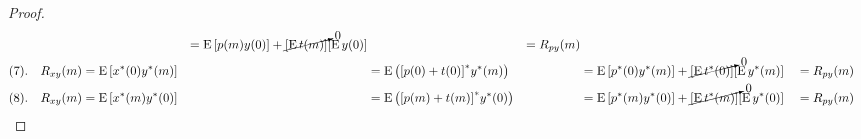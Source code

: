 \begin{proof}
\begin{align*}
      &&=    \operatorname{E}{\left[     p(m)y(0)\right]} + \cancelto{0}{{\left[\operatorname{E}t(m)\right]}} {\left[\operatorname{E}y(0)\right]}
      &&= R_{py}(m)
    \\
    (7).\quad R_{xy}(m)
       &= \operatorname{E}{\left[x^\ast(0)y^\ast(m)\right]}
      &&= \operatorname{E}{\left({\left[p(0)+t(0)\right]}^\ast y^\ast(m)\right)}
      &&=    \operatorname{E}{\left[     p^\ast(0)y^\ast(m)\right]} + \cancelto{0}{{\left[\operatorname{E}t^\ast(0)\right]}} {\left[\operatorname{E}y^\ast(m)\right]}
      &&= R_{py}(m)
    \\
    (8).\quad R_{xy}(m)
       &= \operatorname{E}{\left[x^\ast(m)y^\ast(0)\right]}
      &&= \operatorname{E}{\left({\left[p(m)+t(m)\right]}^\ast y^\ast(0)\right)}
      &&=    \operatorname{E}{\left[     p^\ast(m)y^\ast(0)\right]} + \cancelto{0}{{\left[\operatorname{E}t^\ast(m)\right]}} {\left[\operatorname{E}y^\ast(0)\right]}
      &&= R_{py}(m)
  \end{align*}
\end{proof}
